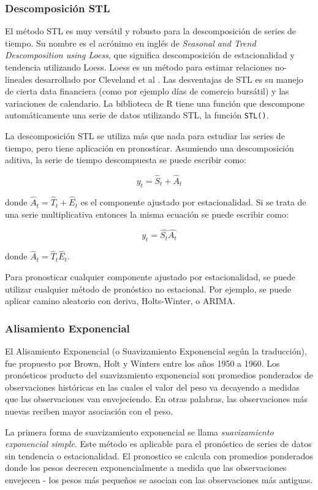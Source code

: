 \subsubsection{Descomposición STL}
El método STL es muy versátil y robusto para la descomposición de series de tiempo. Su nombre es el acrónimo en inglés de \emph{Seasonal and Trend Descomposition using Loess}, que significa descomposición de estacionalidad y tendencia utilizando Loess. Loess es un método para estimar relaciones no-lineales desarrollado por Cleveland et al \cite{hyndman}. Las desventajas de STL es su manejo de cierta data financiera (como por ejemplo días de comercio bursátil) y las variaciones de calendario. La biblioteca de R tiene una función que descompone automáticamente una serie de datos utilizando STL, la función \texttt{STL()}.

La descomposición STL se utiliza más que nada para estudiar las series de tiempo, pero tiene aplicación en pronosticar. Asumiendo una descomposición aditiva, la serie de tiempo descompuesta se puede escribir como:

\[ y_{t} = \hat{S}_t + \hat{A}_t \]

donde $\hat{A}_t = \hat{T}_t + \hat{E}_t$ es el componente ajustado por estacionalidad. Si se trata de una serie multiplicativa entonces la misma ecuación se puede escribir como:

\[ y_{t} = \hat{S_t}\hat{A_t}\]

donde $\hat{A}_t = \hat{T}_t\hat{E}_t$.

Para pronosticar cualquier componente ajustado por estacionalidad, se puede utilizar cualquier método de pronóstico no estacional. Por ejemplo, se puede aplicar camino aleatorio con deriva, Holts-Winter, o ARIMA.

\subsubsection{Alisamiento Exponencial}
El Alisamiento Exponencial (o Suavizamiento Exponencial según la traducción), fue propuesto por Brown, Holt y Winters entre los años 1950 a 1960. Los pronósticos producto del suavizamiento exponencial son promedios ponderados de observaciones históricas en las cuales el valor del peso va decayendo a medidas que las observaciones van envejeciendo. En otras palabras, las observaciones más nuevas reciben mayor asociación con el peso.

La primera forma de suavizamiento exponencial se llama \emph{suavizamiento exponencial simple}. Este método es aplicable para el pronóstico de series de datos sin tendencia o estacionalidad. El pronostico se calcula con promedios ponderados donde los pesos decrecen exponencialmente a medida que las observaciones envejecen - los pesos más pequeños se asocian con las observaciones más antiguas.

